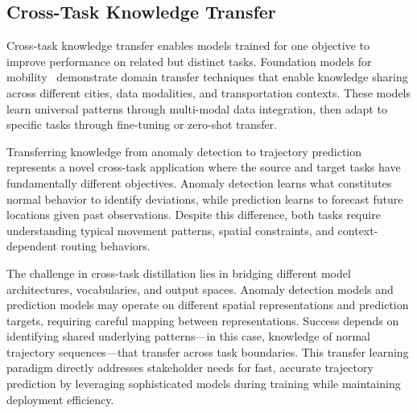 \subsection{Cross-Task Knowledge Transfer}
\label{sec:lit-transfer}

Cross-task knowledge transfer enables models trained for one objective to improve performance on related but distinct tasks. Foundation models for mobility~\cite{maLearningUniversalHuman2025} demonstrate domain transfer techniques that enable knowledge sharing across different cities, data modalities, and transportation contexts. These models learn universal patterns through multi-modal data integration, then adapt to specific tasks through fine-tuning or zero-shot transfer.

Transferring knowledge from anomaly detection to trajectory prediction represents a novel cross-task application where the source and target tasks have fundamentally different objectives. Anomaly detection learns what constitutes normal behavior to identify deviations, while prediction learns to forecast future locations given past observations. Despite this difference, both tasks require understanding typical movement patterns, spatial constraints, and context-dependent routing behaviors.

The challenge in cross-task distillation lies in bridging different model architectures, vocabularies, and output spaces. Anomaly detection models and prediction models may operate on different spatial representations and prediction targets, requiring careful mapping between representations. Success depends on identifying shared underlying patterns—in this case, knowledge of normal trajectory sequences—that transfer across task boundaries. This transfer learning paradigm directly addresses stakeholder needs for fast, accurate trajectory prediction by leveraging sophisticated models during training while maintaining deployment efficiency.
